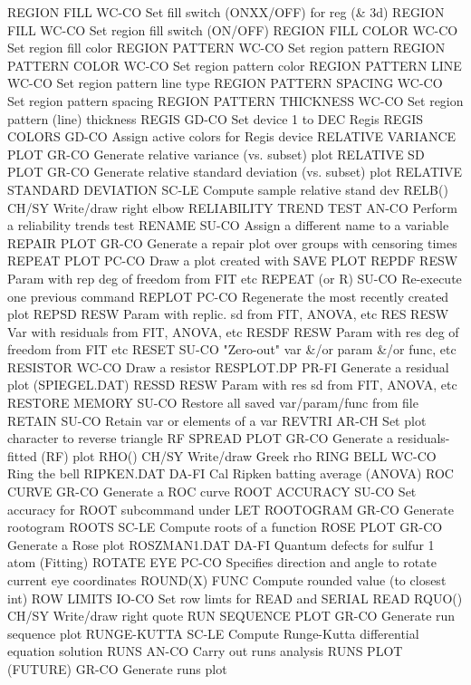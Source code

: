 REGION FILL                 WC-CO Set fill switch (ONXX/OFF) for reg (& 3d)
REGION FILL                 WC-CO Set region fill switch (ON/OFF)
REGION FILL COLOR           WC-CO Set region fill color
REGION PATTERN              WC-CO Set region pattern
REGION PATTERN COLOR        WC-CO Set region pattern color
REGION PATTERN LINE         WC-CO Set region pattern line type
REGION PATTERN SPACING      WC-CO Set region pattern spacing
REGION PATTERN THICKNESS    WC-CO Set region pattern (line) thickness
REGIS                       GD-CO Set device 1 to DEC Regis
REGIS COLORS                GD-CO Assign active colors for Regis device
RELATIVE VARIANCE PLOT      GR-CO Generate relative variance (vs. subset) plot
RELATIVE SD PLOT            GR-CO Generate relative standard deviation (vs. subset) plot
RELATIVE STANDARD DEVIATION SC-LE Compute sample relative stand dev
RELB()                      CH/SY Write/draw right elbow
RELIABILITY TREND TEST      AN-CO Perform a reliability trends test
RENAME                      SU-CO Assign a different name to a variable
REPAIR PLOT                 GR-CO Generate a repair plot over groups with censoring times
REPEAT PLOT                 PC-CO Draw a plot created with SAVE PLOT
REPDF                       RESW  Param with rep deg of freedom from FIT etc
REPEAT (or R)               SU-CO Re-execute one previous command
REPLOT                      PC-CO Regenerate the most recently created plot
REPSD                       RESW  Param with replic. sd from FIT, ANOVA, etc
RES                         RESW  Var with residuals from FIT, ANOVA, etc
RESDF                       RESW  Param with res deg of freedom from FIT etc
RESET                       SU-CO "Zero-out" var &/or param &/or func, etc
RESISTOR                    WC-CO Draw a resistor
RESPLOT.DP                  PR-FI Generate a residual plot (SPIEGEL.DAT)
RESSD                       RESW  Param with res sd from FIT, ANOVA, etc
RESTORE MEMORY              SU-CO Restore all saved var/param/func from file
RETAIN                      SU-CO Retain var or elements of a var
REVTRI                      AR-CH Set plot character to reverse triangle
RF SPREAD PLOT              GR-CO Generate a residuals-fitted (RF)  plot
RHO()                       CH/SY Write/draw Greek rho
RING BELL                   WC-CO Ring the bell
RIPKEN.DAT                  DA-FI Cal Ripken batting average (ANOVA)
ROC CURVE                   GR-CO Generate a ROC curve
ROOT ACCURACY               SU-CO Set accuracy for ROOT subcommand under LET
ROOTOGRAM                   GR-CO Generate rootogram
ROOTS                       SC-LE Compute roots of a function
ROSE PLOT                   GR-CO Generate a Rose plot
ROSZMAN1.DAT                DA-FI Quantum defects for sulfur 1 atom (Fitting)
ROTATE EYE                  PC-CO Specifies direction and angle to rotate current eye coordinates
ROUND(X)                    FUNC  Compute rounded value (to closest int)
ROW LIMITS                  IO-CO Set row limts for READ and SERIAL READ
RQUO()                      CH/SY Write/draw right quote
RUN SEQUENCE PLOT           GR-CO Generate run sequence plot
RUNGE-KUTTA                 SC-LE Compute Runge-Kutta differential equation solution
RUNS                        AN-CO Carry out runs analysis
RUNS PLOT (FUTURE)          GR-CO Generate runs plot

